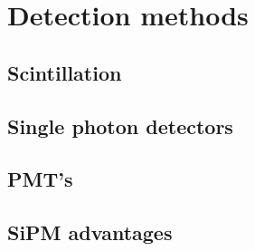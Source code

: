 \chapter{Detection methods}

\section{Scintillation}

\section{Single photon detectors}

\section{PMT's}

\section{SiPM advantages}